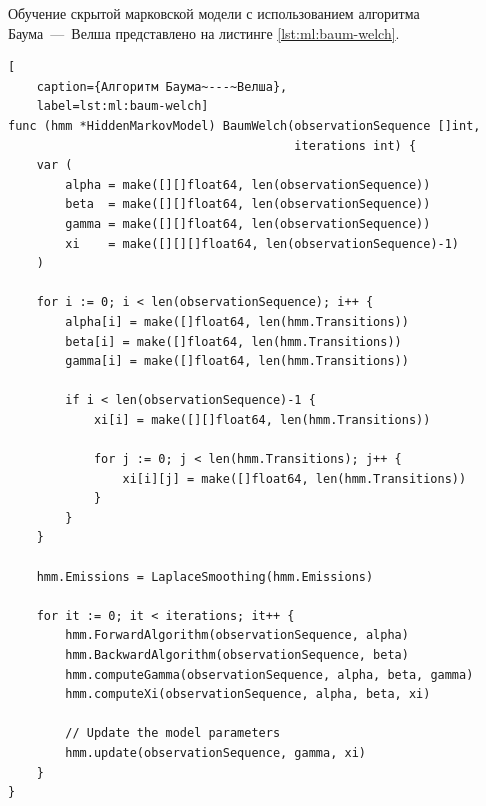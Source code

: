 Обучение скрытой марковской модели с использованием алгоритма Баума~---~Велша представлено на листинге \ref{lst:ml:baum-welch}.
\begin{lstlisting}[
	caption={Алгоритм Баума~---~Велша},
	label=lst:ml:baum-welch]
func (hmm *HiddenMarkovModel) BaumWelch(observationSequence []int,
										iterations int) {
	var (
		alpha = make([][]float64, len(observationSequence))
		beta  = make([][]float64, len(observationSequence))
		gamma = make([][]float64, len(observationSequence))
		xi    = make([][][]float64, len(observationSequence)-1)
	)
	
	for i := 0; i < len(observationSequence); i++ {
		alpha[i] = make([]float64, len(hmm.Transitions))
		beta[i] = make([]float64, len(hmm.Transitions))
		gamma[i] = make([]float64, len(hmm.Transitions))
		
		if i < len(observationSequence)-1 {
			xi[i] = make([][]float64, len(hmm.Transitions))
			
			for j := 0; j < len(hmm.Transitions); j++ {
				xi[i][j] = make([]float64, len(hmm.Transitions))
			}
		}
	}
	
	hmm.Emissions = LaplaceSmoothing(hmm.Emissions)
	
	for it := 0; it < iterations; it++ {
		hmm.ForwardAlgorithm(observationSequence, alpha)
		hmm.BackwardAlgorithm(observationSequence, beta)
		hmm.computeGamma(observationSequence, alpha, beta, gamma)
		hmm.computeXi(observationSequence, alpha, beta, xi)
		
		// Update the model parameters
		hmm.update(observationSequence, gamma, xi)
	}
}
\end{lstlisting}

